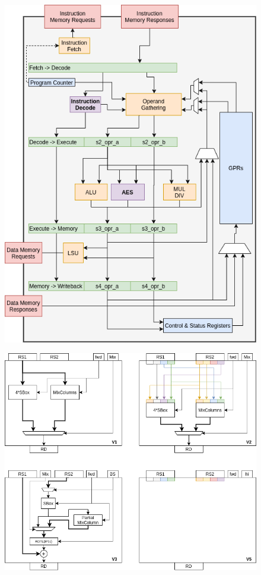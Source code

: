 \begin{figure}
\centering
\includegraphics[scale=0.5,angle=90]{diagrams/scarv-cpu-uarch.png}
\label{fig:design:cpu_block:2}
\end{figure}

\begin{figure}
\centering
\includegraphics[scale=0.5]{diagrams/ise-datapaths.png}
\label{fig:design:fu_block:2}
\end{figure}
